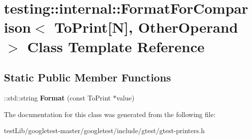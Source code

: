 \hypertarget{classtesting_1_1internal_1_1FormatForComparison_3_01ToPrint[N]_00_01OtherOperand_01_4}{}\section{testing\+:\+:internal\+:\+:Format\+For\+Comparison$<$ To\+Print\mbox{[}N\mbox{]}, Other\+Operand $>$ Class Template Reference}
\label{classtesting_1_1internal_1_1FormatForComparison_3_01ToPrint[N]_00_01OtherOperand_01_4}
\subsection*{Static Public Member Functions}
\begin{DoxyCompactItemize}
\item 
\mbox{\label{classtesting_1_1internal_1_1FormatForComparison_3_01ToPrint[N]_00_01OtherOperand_01_4_a76c526461c8fa7df75f7b32ab889b9e0}} 
\+::std\+::string {\bfseries Format} (const To\+Print $\ast$value)
\end{DoxyCompactItemize}


The documentation for this class was generated from the following file\+:\begin{DoxyCompactItemize}
\item 
test\+Lib/googletest-\/master/googletest/include/gtest/gtest-\/printers.\+h\end{DoxyCompactItemize}
